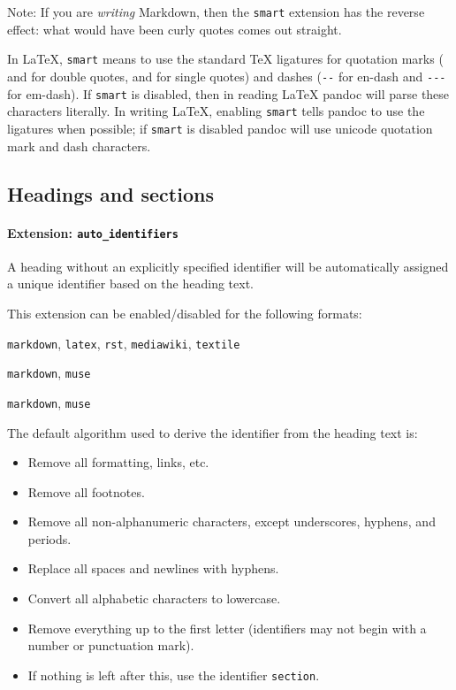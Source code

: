 \documentclass[
]{article}
\providecommand{\tightlist}{%
  \setlength{\itemsep}{0pt}\setlength{\parskip}{0pt}}
\begin{document}
Note: If you are \emph{writing} Markdown, then the \texttt{smart}
extension has the reverse effect: what would have been curly quotes
comes out straight.

In LaTeX, \texttt{smart} means to use the standard TeX ligatures for
quotation marks (\texttt{\textasciigrave{}\textasciigrave{}} and
\texttt{\textquotesingle{}\textquotesingle{}} for double quotes,
\texttt{\textasciigrave{}} and \texttt{\textquotesingle{}} for single
quotes) and dashes (\texttt{-\/-} for en-dash and \texttt{-\/-\/-} for
em-dash). If \texttt{smart} is disabled, then in reading LaTeX pandoc
will parse these characters literally. In writing LaTeX, enabling
\texttt{smart} tells pandoc to use the ligatures when possible; if
\texttt{smart} is disabled pandoc will use unicode quotation mark and
dash characters.

\subsection{Headings and sections}\label{headings-and-sections}

\paragraph{\texorpdfstring{Extension:
\texttt{auto\_identifiers}}{Extension: auto\_identifiers}}\label{extension-auto_identifiers}

A heading without an explicitly specified identifier will be
automatically assigned a unique identifier based on the heading text.

This extension can be enabled/disabled for the following formats:

\begin{description}
\tightlist
\item[input formats]
\texttt{markdown}, \texttt{latex}, \texttt{rst}, \texttt{mediawiki},
\texttt{textile}
\item[output formats]
\texttt{markdown}, \texttt{muse}
\item[enabled by default in]
\texttt{markdown}, \texttt{muse}
\end{description}

The default algorithm used to derive the identifier from the heading
text is:

\begin{itemize}
\tightlist
\item
  Remove all formatting, links, etc.
\item
  Remove all footnotes.
\item
  Remove all non-alphanumeric characters, except underscores, hyphens,
  and periods.
\item
  Replace all spaces and newlines with hyphens.
\item
  Convert all alphabetic characters to lowercase.
\item
  Remove everything up to the first letter (identifiers may not begin
  with a number or punctuation mark).
\item
  If nothing is left after this, use the identifier \texttt{section}.
\end{itemize}
\end{document}
